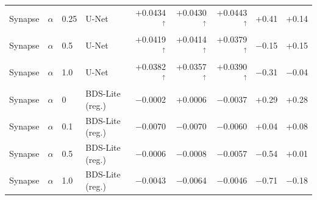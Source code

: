 \begin{tabular}{llllrrrrr}
Synapse & $\alpha$ & 0.25 & U-Net & +0.0434$^{\uparrow}$ & +0.0430$^{\uparrow}$ & +0.0443$^{\uparrow}$ & +0.41 & +0.14 \\
Synapse & $\alpha$ & 0.5 & U-Net & +0.0419$^{\uparrow}$ & +0.0414$^{\uparrow}$ & +0.0379$^{\uparrow}$ & $-$0.15 & +0.15 \\
Synapse & $\alpha$ & 1.0 & U-Net & +0.0382$^{\uparrow}$ & +0.0357$^{\uparrow}$ & +0.0390$^{\uparrow}$ & $-$0.31 & $-$0.04 \\
Synapse & $\alpha$ & 0 & BDS-Lite (reg.) & $-$0.0002 & +0.0006 & $-$0.0037 & +0.29 & +0.28 \\
Synapse & $\alpha$ & 0.1 & BDS-Lite (reg.) & $-$0.0070 & $-$0.0070 & $-$0.0060 & +0.04 & +0.08 \\
Synapse & $\alpha$ & 0.5 & BDS-Lite (reg.) & $-$0.0006 & $-$0.0008 & $-$0.0057 & $-$0.54 & +0.01 \\
Synapse & $\alpha$ & 1.0 & BDS-Lite (reg.) & $-$0.0043 & $-$0.0064 & $-$0.0046 & $-$0.71 & $-$0.18 \\
\bottomrule
\end{tabular}

